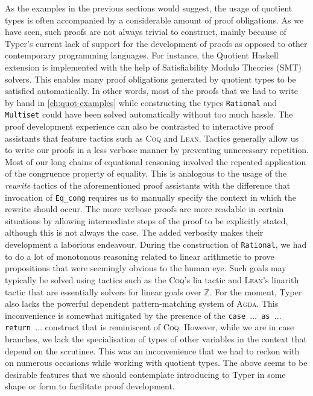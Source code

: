 \documentclass[12pt,twoside,maitrise]{dms}
\theoremstyle{definition}
\numberwithin{equation}{section}
\numberwithin{table}{chapter}
\numberwithin{figure}{chapter}
\newcommand\kw[1] {\textsf{#1}}
\newcommand\id[1] {\texttt{#1}}
\newcommand\fn[1] {\texttt{#1}}
\def\Coq{\textsc{Coq}\xspace}
\def\Agda{\textsc{Agda}\xspace}
\def\Lean{\textsc{Lean}\xspace}
\begin{document}
As the examples in the previous sections would suggest, the usage of quotient
types is often accompanied by a considerable amount of proof obligations. As we
have seen, such proofs are not always trivial to construct, mainly because of
Typer's current lack of support for the development of proofs as opposed to
other contemporary programming languages. For instance, the Quotient Haskell
extension\cite{hewer2023quotient} is implemented with the help of Satisfiability
Modulo Theories (SMT) solvers. This enables many proof obligations generated by
quotient types to be satisfied automatically. In other words, most of the proofs
that we had to write by hand in \autoref{ch:quot-examples} while constructing
the types \id{Rational} and \id{Multiset} could have been solved automatically
without too much hassle. The proof development experience can also be contrasted
to interactive proof assistants that feature tactics such as \Coq{} and \Lean{}.
Tactics generally allow us to write our proofs in a less verbose manner by
preventing unnecessary repetition. Most of our long chains of equational
reasoning involved the repeated application of the congruence property of
equality. This is analogous to the usage of the \emph{rewrite} tactics of the
aforementioned proof assistants with the difference that invocation of
\id{Eq\_cong} requires us to manually specify the context in which the rewrite
should occur. The more verbose proofs are more readable in certain situations by
allowing intermediate steps of the proof to be explicitly stated, although this
is not always the case. The added verbosity makes their development a laborious
endeavour. During the construction of \id{Rational}, we had to do a lot of
monotonous reasoning related to linear arithmetic to prove propositions that
were seemingly obvious to the human eye. Such goals may typically be solved
using tactics such as the \Coq{}'s \kw{lia} tactic and \Lean{}'s \kw{linarith}
tactic that are essentially solvers for linear goals over $\mathbb{Z}$. For the
moment, Typer also lacks the powerful dependent pattern-matching system of
\Agda{}. This inconvenience is somewhat mitigated by the presence of the
\fn{\kw{case} $\ldots$ \kw{as} $\ldots$ \kw{return} $\ldots$} construct that is
reminiscent of \Coq{}. However, while we are in \kw{case} branches, we lack the
specialisation of types of other variables in the context that depend on the
scrutinee. This was an inconvenience that we had to reckon with on numerous
occasions while working with quotient types. The above seems to be desirable
features that we should contemplate introducing to Typer in some shape or form
to facilitate proof development.
\end{document}
